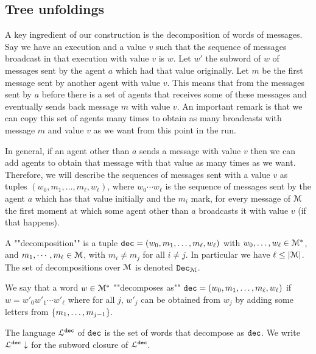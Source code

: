 \subsection{Tree unfoldings}

A key ingredient of our construction is the decomposition of words of messages. Say we have an execution and a value $v$ such that the sequence of messages broadcast in that execution with value $v$ is $w$. Let $w'$ the subword of $w$ of messages sent by the agent $a$ which had that value originally. Let $m$ be the first message sent by another agent with value $v$. This means that from the messages sent by $a$ before there is a set of agents that receives some of these messages and eventually sends back message $m$ with value $v$. An important remark is that we can copy this set of agents many times to obtain as many broadcasts with message $m$ and value $v$ as we want from this point in the run.

In general, if an agent other than $a$ sends a message with value $v$ then we can add agents to obtain that message with that value as many times as we want.
Therefore, we will describe the sequences of messages sent with a value $v$ as tuples $(w_0, m_1, \ldots, m_\ell, w_\ell)$, where $w_0 \cdots w_\ell$ is the sequence of messages sent by the agent $a$ which has that value initially and the $m_i$ mark, for every message of $\mathcal{M}$ the first moment at which some agent other than $a$ broadcasts it with value $v$ (if that happens).


\begin{definition}
	A ""decomposition"" is a tuple $\mathtt{dec} = (w_0, m_1, \ldots, m_\ell, w_\ell)$ with $w_0, \ldots, w_\ell \in \mathcal{M}^*$, and $m_1, \cdots, m_\ell \in \mathcal{M}$, with $m_i \neq m_j$ for all $i\neq j$. In particular we have $\ell \leq |\mathcal{M}|$. The set of decompositions over $\mathcal{M}$ is denoted $\mathtt{Dec}_{\mathcal{M}}$.
	
	We say that a word $w \in \mathcal{M}^*$ ""decomposes as"" $\mathtt{dec} = (w_0, m_1, \ldots, m_\ell, w_\ell)$ if $w = w'_0 w'_1 \cdots w'_\ell$ where for all $j$, $w'_j$ can be obtained from $w_j$ by adding some letters from $\{m_1, \ldots, m_{j-1}\}$.
	
	The language $\mathcal{L}^{\mathtt{\mathtt{dec}}}$ of $\mathtt{dec}$ is the set of words that decompose as $\mathtt{dec}$. We write $\mathcal{L}^{\mathtt{\mathtt{dec}}}\downarrow$ for the subword closure of $\mathcal{L}^{\mathtt{\mathtt{dec}}}$.
\end{definition}


